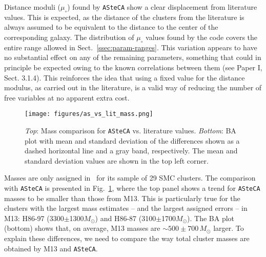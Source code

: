\documentclass[draft]{aa}
\renewcommand{\includegraphics}[2][]{}
\begin{document}
Distance moduli ($\mu_{\circ}$) found by \texttt{ASteCA} show a clear
displacement from literature values. This is expected, as the distance of the
clusters from the literature is always assumed to be equivalent to the
distance to the center of the corresponding galaxy.
The distribution of $\mu_{\circ}$ values found by the code covers the entire
range allowed in Sect.~\ref{ssec:param-ranges}.
%
This variation appears to have no substantial effect on
any of the remaining parameters, something that could in principle be expected
owing to the known correlations between them (see Paper I, Sect. 3.1.4).
This reinforces the idea that using a fixed value for the distance modulus, as
carried out in the literature, is a valid way of reducing the number of free variables
at no apparent extra cost.\\

\begin{figure}
\centering
\texttt{[image: figures/as\_vs\_lit\_mass.png]}
\caption{\emph{Top}: Mass comparison for \texttt{ASteCA} vs. literature
values.
\emph{Bottom}: BA plot with mean and standard deviation of the differences
shown as a dashed horizontal line and a gray band, respectively. The mean and
standard deviation values are shown in the top left corner.}
\label{fig:as_vs_lit_mass}
\end{figure}

Masses are only assigned in~\citet[][M13]{Maia_2013} for its sample of 29
SMC clusters. The comparison with \texttt{ASteCA} is presented in
Fig.~\ref{fig:as_vs_lit_mass}, where the top panel shows a trend for
\texttt{ASteCA} masses to be smaller than those from M13. This is particularly
true for the clusters with the largest mass estimates -- and the largest
assigned errors -- in M13: H86-97 (3300$\pm$1300$M_{\odot}$) and H86-87
(3100$\pm$1700$M_{\odot}$). The BA plot (bottom) shows that, on average, M13
masses are ${\sim}500{\pm}700\,M_{\odot}$ larger.
%
To explain these differences, we need to compare the way total cluster masses
are obtained by M13 and \texttt{ASteCA}.
\end{document}
